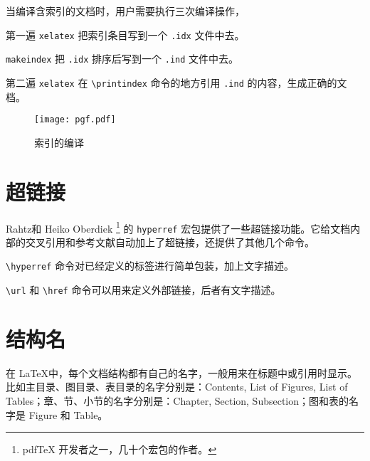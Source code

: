 当编译含索引的文档时，用户需要执行三次编译操作，

\begin{compactenum}
    \item 第一遍 \texttt{xelatex} 把索引条目写到一个 \texttt{.idx} 文件中去。
    \item \texttt{makeindex} 把 \texttt{.idx} 排序后写到一个 \texttt{.ind} 文件中去。
    \item 第二遍 \texttt{xelatex} 在 \verb|\printindex| 命令的地方引用 \texttt{.ind} 的内容，生成正确的文档。
\end{compactenum}

\begin{figure}[htbp]
\centering
\texttt{[image: pgf.pdf]}
\caption{索引的编译}
\label{fig:index}
\end{figure}

\section{超链接}
\label{sec:hyperlink}

Rahtz\indexRahtz 和 Heiko Oberdiek\indexOberdiek{} \footnote{pdfTeX 开发者之一，几十个宏包的作者。} 的 \texttt{hyperref} 宏包\citep{Rahtz_2010}提供了一些超链接功能。它给文档内部的交叉引用和参考文献自动加上了超链接，还提供了其他几个命令。

\verb|\hyperref| 命令对已经定义的标签进行简单包装，加上文字描述。

\begin{example}[h]
\caption{\texttt{\char`\\hyperref} 命令}
\label{exa:hyperref}
\end{example}

\verb|\url| 和 \verb|\href| 命令可以用来定义外部链接，后者有文字描述。

\begin{example}[h]
\caption{\texttt{\char`\\url} 和 \texttt{\char`\\href} 命令}
\label{exa:href}
\end{example}

\section{结构名}

在 \LaTeX 中，每个文档结构都有自己的名字，一般用来在标题中或引用时显示。比如主目录、图目录、表目录的名字分别是：Contents, List of Figures, List of Tables；章、节、小节的名字分别是：Chapter, Section, Subsection；图和表的名字是 Figure 和 Table。


